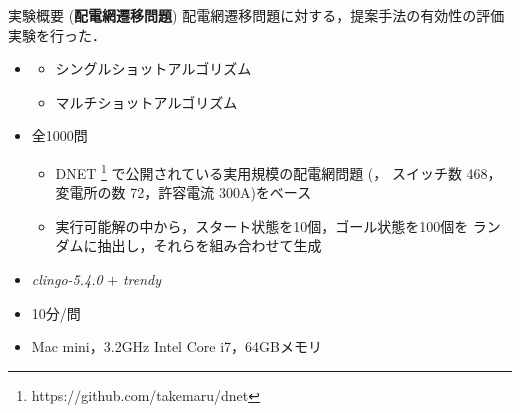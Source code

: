 \documentclass[dvipdfmx,11pt]{beamer}
\begin{document}
\begin{frame}{実験概要 (\textbf{配電網遷移問題})}
  \renewcommand{\thefootnote}{\fnsymbol{footnote}}
  \setcounter{footnote}{1}
 配電網遷移問題に対する，提案手法の有効性の評価実験を行った．
  \vfill
  \begin{itemize}
  \item {}
    \begin{itemize}
    \item シングルショットアルゴリズム
    \item マルチショットアルゴリズム
    \end{itemize}
  \item {} 全1000問
    \begin{itemize}
    \item DNET \footnote{https://github.com/takemaru/dnet}
      で公開されている実用規模の配電網問題 (，
      スイッチ数 468，変電所の数 72，許容電流 300A)をベース
    \item 実行可能解の中から，スタート状態を10個，ゴール状態を100個を
          ランダムに抽出し，それらを組み合わせて生成
    \end{itemize}
  \item {} \textit{clingo-5.4.0} $+$ \textit{trendy}
   \item {} 10分/問
  \item {} Mac mini，3.2GHz Intel Core i7，64GBメモリ
  \end{itemize}
\end{frame}
\end{document}
